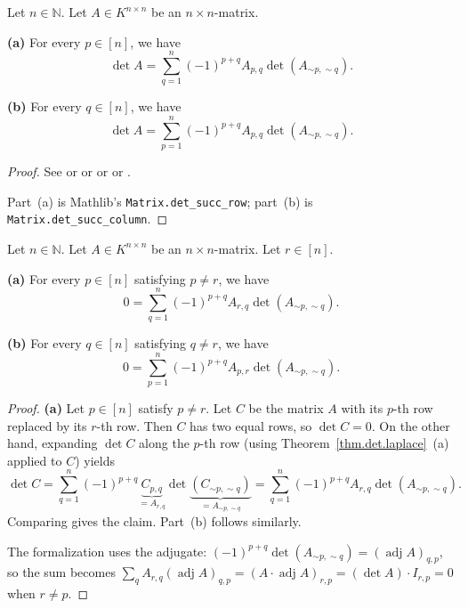 \begin{theorem}
\label{thm.det.laplace}
\leantarget
\leanok
Let $n \in \mathbb{N}$. Let $A \in K^{n \times n}$ be an $n \times n$-matrix.

\textbf{(a)} For every $p \in [n]$, we have
\[
  \det A = \sum_{q=1}^{n} (-1)^{p+q} A_{p,q} \det(A_{\sim p, \sim q}).
\]

\textbf{(b)} For every $q \in [n]$, we have
\[
  \det A = \sum_{p=1}^{n} (-1)^{p+q} A_{p,q} \det(A_{\sim p, \sim q}).
\]
\end{theorem}

\begin{proof}
See \cite[Theorem 6.82]{detnotes} or
\cite[Lemma 4.7.7]{Ford21} or \cite[5.8 and 5.8']{Laue-det} or
\cite[Proposition B.24 and Proposition B.25]{Strick13} or \cite[Theorem
9.48]{Loehr-BC}.

Part~(a) is Mathlib's \texttt{Matrix.det\_succ\_row}; part~(b) is
\texttt{Matrix.det\_succ\_column}.
\end{proof}

\begin{proposition}
\label{prop.det.laplace.0}
\leantarget
\leanok
Let $n \in \mathbb{N}$. Let $A \in K^{n \times n}$ be an $n \times n$-matrix.
Let $r \in [n]$.

\textbf{(a)} For every $p \in [n]$ satisfying $p \neq r$, we have
\[
  0 = \sum_{q=1}^{n} (-1)^{p+q} A_{r,q} \det(A_{\sim p, \sim q}).
\]

\textbf{(b)} For every $q \in [n]$ satisfying $q \neq r$, we have
\[
  0 = \sum_{p=1}^{n} (-1)^{p+q} A_{p,r} \det(A_{\sim p, \sim q}).
\]
\end{proposition}

\begin{proof}
\textbf{(a)} Let $p \in [n]$ satisfy $p \neq r$. Let $C$ be the matrix $A$
with its $p$-th row replaced by its $r$-th row. Then $C$ has two equal rows,
so $\det C = 0$. On the other hand, expanding $\det C$ along the $p$-th row
(using Theorem~\ref{thm.det.laplace}~(a) applied to $C$) yields
\[
  \det C = \sum_{q=1}^{n} (-1)^{p+q} \underbrace{C_{p,q}}_{= A_{r,q}}
           \det\underbrace{(C_{\sim p, \sim q})}_{= A_{\sim p, \sim q}}
         = \sum_{q=1}^{n} (-1)^{p+q} A_{r,q} \det(A_{\sim p, \sim q}).
\]
Comparing gives the claim. Part~(b) follows similarly.

The formalization uses the adjugate: $(-1)^{p+q} \det(A_{\sim p, \sim q})
= (\operatorname{adj} A)_{q,p}$, so the sum becomes
$\sum_q A_{r,q} (\operatorname{adj} A)_{q,p} = (A \cdot \operatorname{adj} A)_{r,p}
= (\det A) \cdot I_{r,p} = 0$ when $r \neq p$.
\end{proof}

